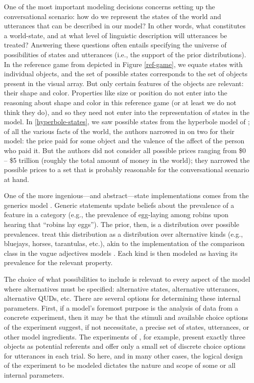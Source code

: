 \documentclass{sp}
\begin{document}
One of the most important modeling decisions concerns setting up the conversational scenario: how do we represent the states of the world and utterances that can be described in our model? In other words, what constitutes a world-state, and at what level of linguistic description will utterances be treated? Answering these questions often entails specifying the universe of possibilities of states and utterances (i.e., the support of the prior distributions). 
In the reference game from \cite{frankgoodman2012} depicted in Figure \ref{ref-game}, we equate states with individual objects, and the set of possible states corresponds to the set of objects present in the visual array. But only certain features of the objects are relevant: their shape and color. Properties like size or position do not enter into the reasoning about shape and color in this reference game (or at least we do not think they do), and so they need not enter into the representation of states in the model. In \ref{hyperbole-states}, we saw possible states from the hyperbole model of \cite{kaoetal2014}; of all the various facts of the world, the authors narrowed in on two for their model: the price paid for some object and the valence of the affect of the person who paid it. 
But the authors did not consider all possible prices ranging from \$0  -- \$5 trillion (roughly the total amount of money in the world); they narrowed the possible prices to a set that is probably reasonable for the conversational scenario at hand.

One of the more ingenious---and abstract---state implementations comes from the generics model \citep{tesslergoodman2019}. Generic statements update beliefs about the prevalence of a feature in a category (e.g., the prevalence of egg-laying among robins upon hearing that ``robins lay eggs''). The prior, then, is a distribution over possible prevalences. \citeauthor{tesslergoodman2019} treat this distribution as a distribution over alternative kinds (e.g., bluejays, horses, tarantulas, etc.), akin to the implementation of the comparison class in the vague adjectives models \citep{lassitergoodman2013, tessler2017comparisonclass}. Each kind is then modeled as having its prevalence for the relevant property.

The choice of what possibilities to include is relevant to every aspect of the model where alternatives must be specified: alternative states, alternative utterances, alternative QUDs, etc.
There are several options for determining these internal parameters.
First, if a model's foremost purpose is the analysis of data from a concrete experiment, then it may be that the stimuli and available choice options of the experiment suggest, if not necessitate, a precise set of states, utterances, or other model ingredients.
The experiments of \citet{frankgoodman2012}, for example, present exactly three objects as potential referents and offer only a small set of discrete choice options for utterances in each trial.
So here, and in many other cases, the logical design of the experiment to be modeled dictates the nature and scope of some or all internal parameters.
\end{document}
